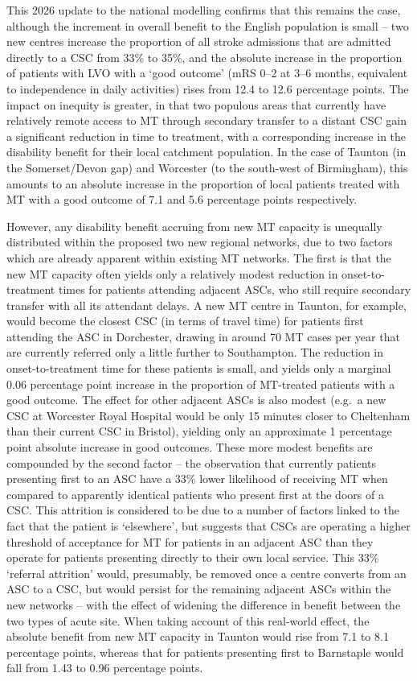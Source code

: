 This 2026 update to the national modelling confirms that this remains the case, although the increment in overall benefit to the English population is small -- two new centres increase the proportion of all stroke admissions that are admitted directly to a CSC from 33\% to 35\%, and the absolute increase in the proportion of patients with LVO with a `good outcome' (mRS 0--2 at 3--6 months, equivalent to independence in daily activities) rises from 12.4 to 12.6 percentage points. The impact on inequity is greater, in that two populous areas that currently have relatively remote access to MT through secondary transfer to a distant CSC gain a significant reduction in time to treatment, with a corresponding increase in the disability benefit for their local catchment population. In the case of Taunton (in the Somerset/Devon gap) and Worcester (to the south-west of Birmingham), this amounts to an absolute increase in the proportion of local patients treated with MT with a good outcome of 7.1 and 5.6 percentage points respectively.

However, any disability benefit accruing from new MT capacity is unequally distributed within the proposed two new regional networks, due to two factors which are already apparent within existing MT networks. The first is that the new MT capacity often yields only a relatively modest reduction in onset-to-treatment times for patients attending adjacent ASCs, who still require secondary transfer with all its attendant delays. A new MT centre in Taunton, for example, would become the closest CSC (in terms of travel time) for patients first attending the ASC in Dorchester, drawing in around 70 MT cases per year that are currently referred only a little further to Southampton. The reduction in onset-to-treatment time for these patients is small, and yields only a marginal 0.06 percentage point increase in the proportion of MT-treated patients with a good outcome. The effect for other adjacent ASCs is also modest (e.g.\ a new CSC at Worcester Royal Hospital would be only 15 minutes closer to Cheltenham than their current CSC in Bristol), yielding only an approximate 1 percentage point absolute increase in good outcomes. These more modest benefits are compounded by the second factor -- the observation that currently patients presenting first to an ASC have a 33\% lower likelihood of receiving MT when compared to apparently identical patients who present first at the doors of a CSC. This attrition is considered to be due to a number of factors linked to the fact that the patient is `elsewhere', but suggests that CSCs are operating a higher threshold of acceptance for MT for patients in an adjacent ASC than they operate for patients presenting directly to their own local service. This 33\% `referral attrition' would, presumably, be removed once a centre converts from an ASC to a CSC, but would persist for the remaining adjacent ASCs within the new networks -- with the effect of widening the difference in benefit between the two types of acute site. When taking account of this real-world effect, the absolute benefit from new MT capacity in Taunton would rise from 7.1 to 8.1 percentage points, whereas that for patients presenting first to Barnstaple would fall from 1.43 to 0.96 percentage points.

